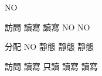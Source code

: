\bTABLE

\bTABLEhead
\bTR
\bTD[nc=2] \eTD \bTD{}\eTD \bTD{}\eTD \bTD{}\eTD \bTD{}\eTD
\eTR
\eTABLEhead

\bTABLEbody
\bTR
\bTD[nr=2]\eTD {}\eTD {}\eTD {}\eTD {}\eTD \bTD NO\eTD
\eTR

\bTR
\bTD 訪問 \eTD \bTD 讀寫 \eTD \bTD 讀寫 \eTD \bTD NO \eTD \bTD NO \eTD
\eTR

\bTR
\bTD[nr=2]\eTD \bTD 分配 \eTD \bTD NO \eTD \bTD 靜態 \eTD \bTD 靜態 \eTD \bTD 靜態 \eTD
\eTR

\bTR
\bTD 訪問 \eTD \bTD 讀寫 \eTD \bTD 只讀 \eTD \bTD 讀寫 \eTD \bTD 讀寫 \eTD
\eTR
\eTABLEbody

\eTABLE

